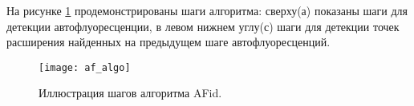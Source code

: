 На рисунке \ref{af_algo} продемонстрированы шаги алгоритма: сверху(а) показаны шаги для детекции автофлуоресценции, в левом нижнем углу(с) шаги для детекции точек расширения найденных на предыдущем шаге автофлуоресценций. \cite{Conference}

\begin{figure}[H]
	\centering
	\texttt{[image: af\_algo]}
	\caption{Иллюстрация шагов алгоритма AFid.}
	\label{af_algo}
\end{figure}
%
%
%
%
%
%
%
%
%
%
%
%
%
%
% 
%
